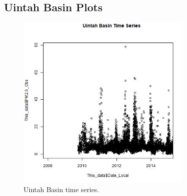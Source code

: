 
\subsection*{Uintah Basin Plots}
\begin{figure} 
\centering 
\includegraphics[width=0.77\textwidth]{Code_Outputs/UintahBasin_time_series.jpg} 
\caption{\label{fig:UintahBasinTS}Uintah Basin time series.} 
\end{figure} 
 
